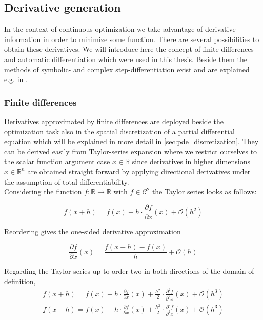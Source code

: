 \documentclass{scrartcl}[12pt, halfparskip]
\numberwithin{equation}{section}
\numberwithin{figure}{section}
\numberwithin{table}{section}
\begin{document}
\subsection{Derivative generation}
\label{sec:derivative_generation}
In the context of continuous optimization we take advantage of derivative information in order to minimize some function. 
There are several possibilities to obtain these derivatives. We will introduce here the concept of finite differences and automatic differentiation which were used in this thesis. 
Beside them the methods of symbolic- and complex step-differentiation exist and are explained e.g. in \cite{diss_jan}.

\subsubsection{Finite differences}
\label{sec:finite_differences}
Derivatives approximated by finite differences are deployed beside the optimization task also in the spatial discretization of a partial differential equation which will be explained in more detail in \cref{sec:pde_discretization}.
They can be derived easily from Taylor-series expansion where we restrict ourselves to the scalar function argument case $x \in \mathbb{R}$ since derivatives in higher dimensions $x \in \mathbb{R}^n$ are obtained straight forward by applying directional derivatives under the assumption of total differentiability.  \\
Considering the function $f: \mathbb{R} \rightarrow \mathbb{R}$ with $f \in \mathcal{C}^2$ the Taylor series looks as follows:


\begin{equation}
f(x+h) = f(x) + h \cdot \frac{\partial f}{\partial x}(x) + \mathcal{O}(h^2)
\end{equation}

Reordering gives the one-sided derivative approximation

\begin{equation}
\frac{\partial f}{\partial x}(x) = \frac{f(x+h) - f(x)}{h} + \mathcal{O}(h)
\label{eq:one_sided_discretized_derivative}
\end{equation}

Regarding the Taylor series up to order two in both directions of the domain of definition,
\begin{subequations}
	\label{eq:finite_differences_taylor_exp}
	\begin{align}
	f(x+h) = f(x) + h \cdot \frac{\partial f}{\partial x}(x) + \frac{h^2}{2} \cdot \frac{\partial^2 f}{\partial^2 x}(x) + \mathcal{O}(h^3) \label{eq:finite_differences_taylor_exp_+} \\
	f(x-h) = f(x) - h \cdot \frac{\partial f}{\partial x}(x) + \frac{h^2}{2} \cdot \frac{\partial^2 f}{\partial^2 x}(x) + \mathcal{O}(h^3)  \label{eq:finite_differences_taylor_exp_-}	
	\end{align}
\end{subequations}
\end{document}
